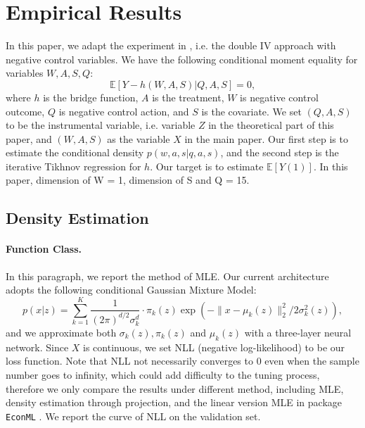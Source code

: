 \documentclass[12pt]{extarticle} %
\newcommand{\E}{\mathbb{E}}
\begin{document}
\section{Empirical Results}
In this paper, we adapt the experiment in \cite{kallus2022causal}, i.e. the double IV approach with negative control variables. We have the following conditional moment equality for variables $W,A,S,Q$:$$
\E[Y - h(W,A,S)|Q,A,S] = 0,
$$
where $h$ is the bridge function, $A$ is the treatment, $W$ is negative control outcome, $Q$ is negative control action, and $S$ is the covariate. We set $(Q,A,S)$ to be the instrumental variable, i.e. variable $Z$ in the theoretical part of this paper, and $(W,A,S)$ as the variable $X$ in the main paper. Our first step is to estimate the conditional density $p(w,a,s|q,a,s)$, and the second step is the iterative Tikhnov regression for $h$. Our target is to estimate $\E[Y(1)]$. In this paper, dimension of W = 1, dimension of S and Q = 15.
\subsection{Density Estimation}
\paragraph{Function Class.} In this paragraph, we report the method of MLE. Our current architecture adopts the following conditional Gaussian Mixture Model: $$
p(x|z) = \sum_{k = 1}^K  \frac{1}{(2\pi)^{d/2}\sigma_k^d}\cdot \pi_k(z)\exp(-\|x - \mu_k(z)\|_2^2 / 2\sigma_k^2(z)),
$$
and we approximate both $\sigma_k(z), \pi_k(z)$ and $\mu_k(z)$ with a three-layer neural network. Since $X$ is continuous, we set NLL (negative log-likelihood) to be our loss function. Note that NLL not necessarily converges to 0 even when the sample number goes to infinity, which could add difficulty to the tuning process, therefore we only compare the results under different method, including MLE, density estimation through projection, and the linear version MLE in package \texttt{EconML} . We report the curve of NLL on the validation set. 
\end{document}
